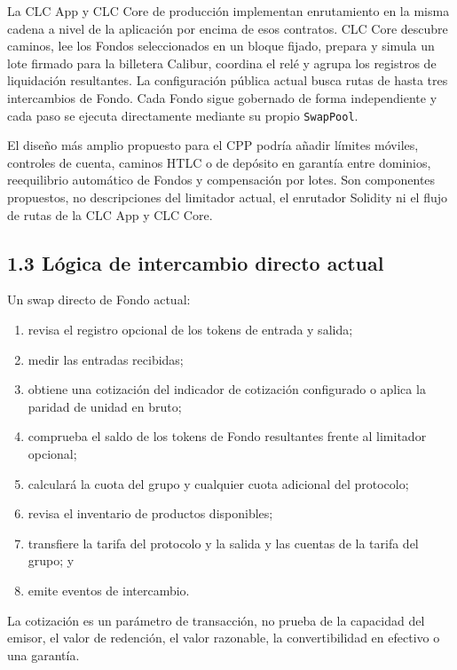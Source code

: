 \documentclass[11pt]{article}
\begin{document}
La CLC App y CLC Core de producción implementan enrutamiento en la misma cadena a nivel de la aplicación por encima de esos contratos. CLC Core descubre caminos, lee los Fondos seleccionados en un bloque fijado, prepara y simula un lote firmado para la billetera Calibur, coordina el relé y agrupa los registros de liquidación resultantes. La configuración pública actual busca rutas de hasta tres intercambios de Fondo. Cada Fondo sigue gobernado de forma independiente y cada paso se ejecuta directamente mediante su propio \texttt{SwapPool}.

El diseño más amplio propuesto para el CPP podría añadir límites móviles, controles de cuenta, caminos HTLC o de depósito en garantía entre dominios, reequilibrio automático de Fondos y compensación por lotes. Son componentes propuestos, no descripciones del limitador actual, el enrutador Solidity ni el flujo de rutas de la CLC App y CLC Core.

\subsection*{1.3 Lógica de intercambio directo actual}

Un swap directo de Fondo actual:

\begin{enumerate}[leftmargin=*]
\item revisa el registro opcional de los tokens de entrada y salida;
\item medir las entradas recibidas;
\item obtiene una cotización del indicador de cotización configurado o aplica la paridad de unidad en bruto;
\item comprueba el saldo de los tokens de Fondo resultantes frente al limitador opcional;
\item calculará la cuota del grupo y cualquier cuota adicional del protocolo;
\item revisa el inventario de productos disponibles;
\item transfiere la tarifa del protocolo y la salida y las cuentas de la tarifa del grupo; y
\item emite eventos de intercambio.
\end{enumerate}
La cotización es un parámetro de transacción, no prueba de la capacidad del emisor, el valor de redención, el valor razonable, la convertibilidad en efectivo o una garantía.
\end{document}
